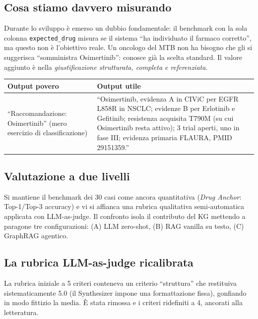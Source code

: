 \documentclass[11pt,a4paper]{article}
\newcommand{\code}[1]{\texttt{\small #1}}
\begin{document}
\subsection{Cosa stiamo davvero misurando}
Durante lo sviluppo \`e emerso un dubbio fondamentale: il benchmark con la sola colonna \code{expected\_drug} misura se il sistema ``ha individuato il farmaco corretto'', ma questo non \`e l'obiettivo reale. Un oncologo del MTB non ha bisogno che gli si suggerisca ``somministra Osimertinib'': conosce gi\`a la scelta standard. Il valore aggiunto \`e nella \emph{giustificazione strutturata, completa e referenziata}.

\begin{center}
\small
\begin{tabularx}{\textwidth}{@{}p{4.6cm} X@{}}
\toprule
\bfseries\color{gapred} Output povero & \bfseries\color{passgreen} Output utile \\
\midrule
``Raccomandazione: Osimertinib'' (mero esercizio di classificazione) &
``Osimertinib, evidenza A in CIViC per EGFR L858R in NSCLC; evidenze B per Erlotinib e Gefitinib; resistenza acquisita T790M (su cui Osimertinib resta attivo); 3 trial aperti, uno in fase III; evidenza primaria FLAURA, PMID 29151359.'' \\
\bottomrule
\end{tabularx}
\end{center}

\subsection{Valutazione a due livelli}
Si mantiene il benchmark dei 30 casi come ancora quantitativa (\emph{Drug Anchor}: Top-1/Top-3 accuracy) e vi si affianca una rubrica qualitativa semi-automatica applicata con LLM-as-judge. Il confronto isola il contributo del KG mettendo a paragone tre configurazioni: (A) LLM zero-shot, (B) RAG vanilla su testo, (C) GraphRAG agentico.

\subsection{La rubrica LLM-as-judge ricalibrata}
La rubrica iniziale a 5 criteri conteneva un criterio ``struttura'' che restituiva sistematicamente 5.0 (il Synthesizer impone una formattazione fissa), gonfiando in modo fittizio la media. \`E stata rimossa e i criteri ridefiniti a 4, ancorati alla letteratura.
\end{document}
